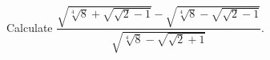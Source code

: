 Calculate $\dfrac{\sqrt{\sqrt[4]8+\sqrt{\sqrt2-1}}-\sqrt{\sqrt[4]8-\sqrt{\sqrt2-1}}}{\sqrt{\sqrt[4]8-\sqrt{\sqrt2+1}}}$.
